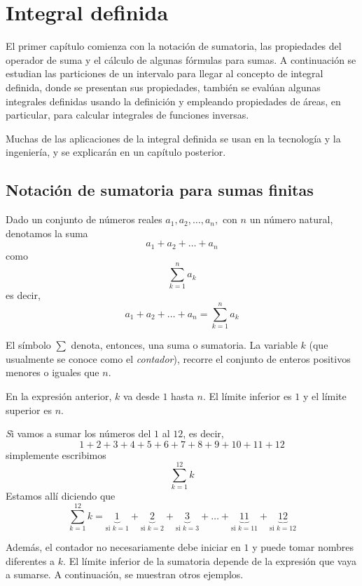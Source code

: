 \chapter[Integral definida]{Integral definida}\label{definida}

El primer capítulo comienza con la notación de sumatoria, las propiedades del operador de suma y el cálculo de algunas fórmulas para sumas. A continuación se estudian las particiones de un intervalo para llegar al concepto de integral definida, donde se presentan sus propiedades, también se evalúan algunas integrales definidas usando la definición y empleando propiedades de áreas, en particular, para calcular integrales de funciones inversas.

Muchas de las aplicaciones de la integral definida se usan en la tecnología y la ingeniería, y se explicarán en un capítulo posterior.

\section{Notación de sumatoria para sumas finitas}

Dado un conjunto de números reales $a_{1},a_{2},\ldots ,a_{n},$ con $n$ un número natural, denotamos la suma
\[
a_{1}+a_{2}+\ldots +a_{n}
\]
como
\[
\sum_{k=1}^n a_k
\]
es decir,
\[
a_{1}+a_{2}+\ldots +a_{n}=\sum_{k=1}^n a_k
\]

El símbolo $\sum $ denota, entonces, una suma o sumatoria. La variable $k$ (que usualmente se conoce como el \textit{contador}), recorre el conjunto de enteros positivos menores o iguales que $n$.

En la expresión anterior, $k$ va desde $1$ hasta $n$. El límite inferior es $1$ y el límite superior es $n$.

\begin{ejemplo}
\textit Si vamos a sumar los números del $1$ al $12$, es decir,
\[
1+2+3+4+5+6+7+8+9+10+11+12
\]
simplemente escribimos
\[
\sum_{k=1}^{12} k
\]
Estamos allí diciendo que
\[
\sum_{k=1}^{12} k=\underbrace{1}_{\text{si }k=1}+\underbrace{2}_{\text{si }k=2}+\underbrace{3}_{\text{si }k=3}+\ldots+\underbrace{11}_{\text{si }k=11}+\underbrace{12}_{\text{si }k=12}
\]
\end{ejemplo}

Además, el contador no necesariamente debe iniciar en $1$ y puede tomar nombres diferentes a $k$. El límite inferior de la sumatoria depende de la expresión que vaya a sumarse. A continuación, se muestran otros ejemplos.

